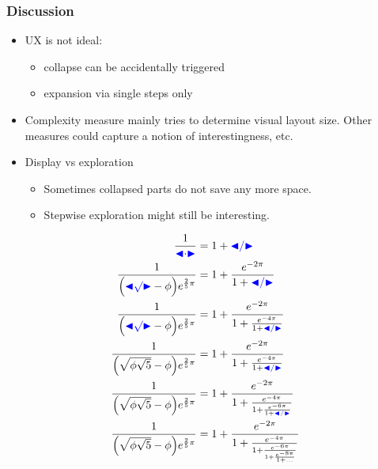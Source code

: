 \documentclass{beamer}
\begin{document}
\begin{frame}
  \frametitle{Discussion}
  \begin{minipage}{.5\linewidth}
    \begin{itemize}
    \item UX is not ideal:
      \begin{itemize}
      \item collapse can be accidentally triggered
      \item expansion via single steps only
      \end{itemize}
    \item Complexity measure mainly tries to determine visual layout size.
      Other measures could capture a notion of interestingness, etc.
   \item Display vs exploration
      \begin{itemize}
      \item Sometimes collapsed parts do not save any more space.
      \item Stepwise exploration might still be interesting.
      \end{itemize}
    \end{itemize}
  \end{minipage}
  \begin{minipage}{.4\linewidth}\scriptsize
    \begin{align*}
      \frac{1}{\textcolor{blue}{\mathord{\blacktriangleleft}\mathord{\cdot} \mathord{\blacktriangleright}}} &= 1 + \textcolor{blue}{\mathord{\blacktriangleleft}\mathord{/} \mathord{\blacktriangleright}}\\
      \frac{1}{\Bigl(\textcolor{blue}{\mathord{\blacktriangleleft}\mathord{\surd} \mathord{\blacktriangleright}}-\phi\Bigr)
      e^{\frac25\pi}} &=
                        1+\frac{e^{-2\pi}}
                        {1+\textcolor{blue}{\mathord{\blacktriangleleft}\mathord{/} \mathord{\blacktriangleright}}}\\
      \frac{1}{\Bigl(\textcolor{blue}{\mathord{\blacktriangleleft}\mathord{\surd} \mathord{\blacktriangleright}}-\phi\Bigr)
      e^{\frac25\pi}} &=
                        1+\frac{e^{-2\pi}}
                        {1+\frac{e^{-4\pi}}
                        {1+\textcolor{blue}{\mathord{\blacktriangleleft}\mathord{/} \mathord{\blacktriangleright}}}
                        }\\
      \frac{1}{\Bigl(\sqrt{\phi\sqrt{5}}-\phi\Bigr)
      e^{\frac25\pi}} &=
                        1+\frac{e^{-2\pi}}
                        {1+\frac{e^{-4\pi}}
                        {1+\textcolor{blue}{\mathord{\blacktriangleleft}\mathord{/} \mathord{\blacktriangleright}}}
                        }\\
      \frac{1}{\Bigl(\sqrt{\phi\sqrt{5}}-\phi\Bigr)
      e^{\frac25\pi}} &=
                        1+\frac{e^{-2\pi}}
                        {1+\frac{e^{-4\pi}}
                        {1+\frac{e^{-6\pi}}
                        {1+\textcolor{blue}{\mathord{\blacktriangleleft}\mathord{/} \mathord{\blacktriangleright}}}}}
      \\
      \frac{1}{\Bigl(\sqrt{\phi\sqrt{5}}-\phi\Bigr)
      e^{\frac25\pi}} &=
                        1+\frac{e^{-2\pi}}
                        {1+\frac{e^{-4\pi}}
                        {1+\frac{e^{-6\pi}}
                        {1+\frac{e^{-8\pi}}
                        {1+\ldots} } } }
    \end{align*}
  \end{minipage}
\end{frame}
\end{document}
